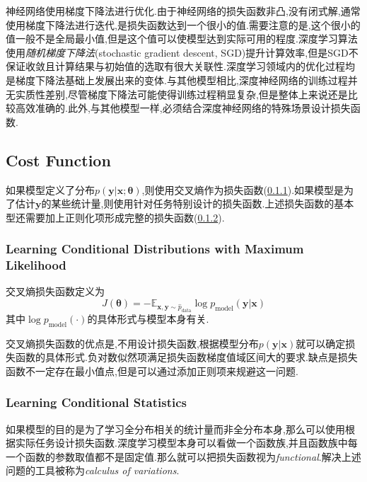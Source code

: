 神经网络使用梯度下降法进行优化.由于神经网络的损失函数非凸,没有闭式解,通常使用梯度下降法进行迭代,是损失函数达到一个很小的值.需要注意的是,这个很小的值一般不是全局最小值,但是这个值可以使模型达到实际可用的程度.深度学习算法使用\textit{随机梯度下降法}(stochastic gradient descent, SGD)提升计算效率,但是SGD不保证收敛且计算结果与初始值的选取有很大关联性.深度学习领域内的优化过程均是梯度下降法基础上发展出来的变体.与其他模型相比,深度神经网络的训练过程并无实质性差别,尽管梯度下降法可能使得训练过程稍显复杂,但是整体上来说还是比较高效准确的.此外,与其他模型一样,必须结合深度神经网络的特殊场景设计损失函数.

\subsection{Cost Function}

如果模型定义了分布$p(\bm y|\bm x;{\bm\theta})$,则使用交叉熵作为损失函数(\ref{sec:cost_func_distribution}).如果模型是为了估计$\bm y$的某些统计量,则使用针对任务特别设计的损失函数.上述损失函数的基本型还需要加上正则化项形成完整的损失函数(\ref{sec:cost_func_statistics}).

\subsubsection{Learning Conditional Distributions with Maximum Likelihood}\label{sec:cost_func_distribution}

交叉熵损失函数定义为
\begin{equation}
J({\bm\theta})=-\mathbb E_{\bm{x,y}\sim\hat p_{\text{data}}}\log p_{\text{model}}(\bm y|\bm x)
\end{equation}
其中$\log p_{\text{model}}(\cdot)$的具体形式与模型本身有关.

交叉熵损失函数的优点是,不用设计损失函数,根据模型分布$p(\bm y|\bm x)$就可以确定损失函数的具体形式.负对数似然项满足损失函数梯度值域区间大的要求.缺点是损失函数不一定存在最小值点,但是可以通过添加正则项来规避这一问题.

\subsubsection{Learning Conditional Statistics}\label{sec:cost_func_statistics}

如果模型的目的是为了学习全分布相关的统计量而非全分布本身,那么可以使用根据实际任务设计损失函数.深度学习模型本身可以看做一个函数族,并且函数族中每一个函数的参数取值都不是固定值.那么就可以把损失函数视为\textit{functional}.解决上述问题的工具被称为\textit{calculus of variations}.

